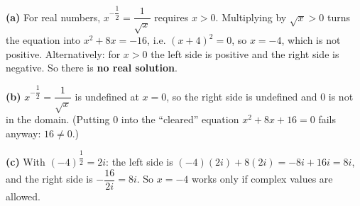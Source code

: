 \textbf{(a)} For real numbers, $x^{-\dfrac{1}{2}}=\dfrac{1}{\sqrt x}$ requires $x>0$. Multiplying by $\sqrt x>0$ turns the equation into $x^2+8x=-16$, i.e. $(x+4)^2=0$, so $x=-4$, which is not positive. Alternatively: for $x>0$ the left side is positive and the right side is negative. So there is \textbf{no real solution}.

\textbf{(b)} $x^{-\dfrac{1}{2}}=\dfrac{1}{\sqrt x}$ is undefined at $x=0$, so the right side is undefined and $0$ is not in the domain. (Putting $0$ into the ``cleared'' equation $x^2+8x+16=0$ fails anyway: $16\ne0$.)

\textbf{(c)} With $(-4)^{\dfrac{1}{2}}=2i$: the left side is $(-4)(2i)+8(2i)=-8i+16i=8i$, and the right side is $-\dfrac{16}{2i}=8i$. So $x=-4$ works only if complex values are allowed.
